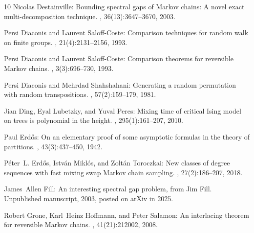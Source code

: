 \begin{thebibliography}{10}
{\sc Nicolas Destainville}: Bounding spectral gaps of {M}arkov chains: {A}
  novel exact multi-decomposition technique.
, 36(13):3647--3670, 2003.
\newblock [\epfmtdoi{10.1088/0305-4470/36/13/301}]

{\sc Persi Diaconis and Laurent Saloff-Coste}: Comparison techniques for random
  walk on finite groups.
, 21(4):2131--2156, 1993.

{\sc Persi Diaconis and Laurent Saloff-Coste}: Comparison theorems for
  reversible {M}arkov chains.
, 3(3):696--730, 1993.

{\sc Persi Diaconis and Mehrdad Shahshahani}: Generating a random permutation
  with random transpositions.
, 57(2):159--179, 1981.
\newblock [\epfmtdoi{10.1007/BF00535487}]

{\sc Jian Ding, Eyal Lubetzky, and Yuval Peres}: Mixing time of critical
  {I}sing model on trees is polynomial in the height.
, 295(1):161--207, 2010.
\newblock [\epfmtdoi{10.1007/s00220-009-0978-y}]

{\sc Paul Erd\H{o}s}: On an elementary proof of some asymptotic formulas in the
  theory of partitions.
, 43(3):437--450, 1942.
\newblock [\epfmtdoi{10.2307/1968802}]

{\sc P{\'e}ter~L. Erd\H{o}s, Istv{\'a}n Mikl{\'o}s, and Zolt{\'an} Toroczkai}:
  New classes of degree sequences with fast mixing swap {M}arkov chain
  sampling.
, 27(2):186--207, 2018.
\newblock [\epfmtdoi{10.1017/S0963548317000499}]

{\sc James~Allen Fill}: An interesting spectral gap problem, from {J}im {F}ill.
\newblock Unpublished manuscript, 2003, posted on arXiv in 2025.

{\sc Robert Grone, Karl~Heinz Hoffmann, and Peter Salamon}: An interlacing
  theorem for reversible {M}arkov chains.
, 41(21):212002, 2008.
\newblock [\epfmtdoi{10.1088/1751-8113/41/21/212002}]


\end{thebibliography}

